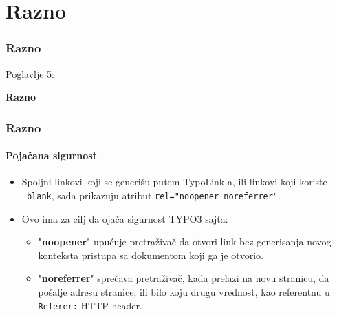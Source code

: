 %

\section{Razno}
\begin{frame}[fragile]
	\frametitle{Razno}

	\begin{center}\huge{Poglavlje 5:}\end{center}
	\begin{center}\huge{\color{typo3darkgrey}\textbf{Razno}}\end{center}

\end{frame}


\begin{frame}[fragile]
	\frametitle{Razno}
	\framesubtitle{Pojačana sigurnost}

	\begin{itemize}
		\item Spoljni linkovi koji se generišu putem TypoLink-a, ili linkovi koji koriste \texttt{\_blank},
			sada prikazuju atribut \texttt{rel="noopener noreferrer"}.
		\item Ovo ima za cilj da ojača sigurnost TYPO3 sajta:

			\begin{itemize}
				\item "\textbf{noopener}" upućuje pretraživač da otvori link bez generisanja
				 	novog konteksta pristupa sa dokumentom koji ga je otvorio.
				\item "\textbf{noreferrer}" sprečava pretraživač, kada prelazi na novu stranicu,
					da pošalje adresu stranice, ili bilo koju drugu vrednost, kao referentnu u
					\texttt{Referer:} HTTP header.
			\end{itemize}

	\end{itemize}

\end{frame}

